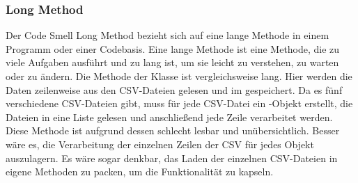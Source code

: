 \subsubsection{Long Method}\label{LM}
Der Code Smell Long Method bezieht sich auf eine lange Methode in einem Programm oder einer Codebasis. Eine lange Methode ist eine Methode, die zu viele Aufgaben ausführt und zu lang ist, um sie leicht zu verstehen, zu warten oder zu ändern. 
Die Methode  der Klasse \href{https://github.com/MichaelaHaag/RezeptApp/blob/main/1-Adapter/src/main/java/de/rezeptapp/adapter/Datenpersistenz/DataReader.java}{} ist vergleichsweise lang. Hier werden die Daten zeilenweise aus den CSV-Dateien gelesen und im  gespeichert.
Da es fünf verschiedene CSV-Dateien gibt, muss für jede CSV-Datei ein -Objekt erstellt, die Dateien in eine Liste gelesen und anschließend jede Zeile verarbeitet werden. Diese Methode ist aufgrund dessen schlecht lesbar und unübersichtlich. Besser wäre es, die Verarbeitung der einzelnen Zeilen der CSV für jedes Objekt auszulagern. Es wäre sogar denkbar, das Laden der einzelnen CSV-Dateien in eigene Methoden zu packen, um die Funktionalität zu kapseln.

